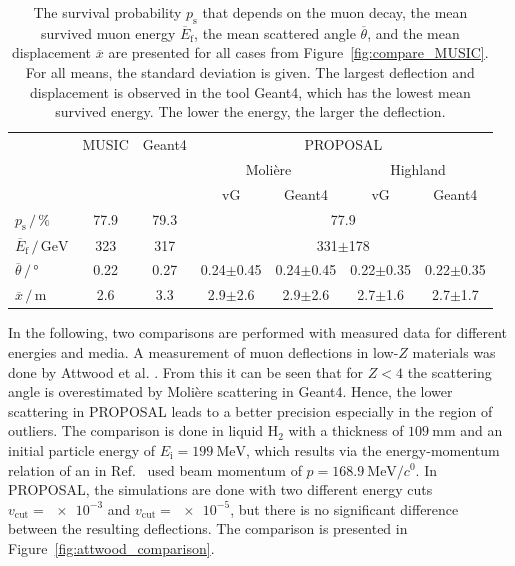 \begin{table}
    \small
    \centering
    \caption{The survival probability $p_{\text{s}}$ that depends on the muon decay, the mean survived muon 
    energy $\overline{E}_{\text{f}}$, the mean scattered angle $\overline{\theta}$,
    and the mean displacement $\overline{x}$ are presented for all cases from 
    Figure~\ref{fig:compare_MUSIC}. For all means, the standard deviation is given.
    The largest deflection and displacement is observed in the tool Geant4, which has the lowest mean survived energy. The lower the energy, the larger the deflection.}
    \begin{tabular}{l|cc|cccc}
        \toprule
        & MUSIC & Geant4 & \multicolumn{4}{c}{PROPOSAL} \\
        &  & & \multicolumn{2}{c}{Molière} & \multicolumn{2}{c}{Highland} \\
        &  &  & vG & Geant4 & vG & Geant4 \\
        \midrule
        $p_{\text{s}}\,/\,\si{\percent}$ & 77.9 & 79.3 &  \multicolumn{4}{c}{77.9}\\
        $\overline{E}_{\text{f}}\,/\,\si{\giga\electronvolt}$ & 323 & 317 & \multicolumn{4}{c}{331$\pm$178} \\
        $\overline{\theta}\,/\,\si{\degree}$ & 0.22 & 0.27 & 0.24$\pm$0.45 & 0.24$\pm$0.45 & 0.22$\pm$0.35 & 0.22$\pm$0.35   \\
        $\overline{x}\,/\,\si{\meter}$ & 2.6 & 3.3 & 2.9$\pm$2.6 & 2.9$\pm$2.6 & 2.7$\pm$1.6 & 2.7$\pm$1.7  \\
     \bottomrule
    \end{tabular}
    \label{tab:compare_MUSIC}
\end{table}

In the following, two comparisons are performed with measured data for 
different energies and media.
A measurement of muon deflections in low-$Z$ materials was done by Attwood et al. \cite{attwood_2006}. 
From this it can be seen that for $Z < 4$ the scattering angle is overestimated 
by Molière scattering in Geant4. Hence, the lower scattering in PROPOSAL leads 
to a better precision especially in the region of outliers. The comparison is 
done in liquid $\text{H}_2$ with a thickness of $\SI{109}{\milli\meter}$ and an 
initial particle energy of $E_{\mathrm{i}} = \SI{199}{\mega\electronvolt}$, which 
results via the energy-momentum relation of an in Ref.~\cite{attwood_2006} used beam momentum 
of $p = \SI[per-mode=symbol]{168.9}{\mega\electronvolt\per\clight}$. 
In PROPOSAL, the simulations are done with two different energy cuts $v_{\mathrm{cut}} = \num{e-3}$ and $v_{\mathrm{cut}} = \num{e-5}$, 
but there is no significant difference between the resulting deflections.
The comparison is presented in Figure~\ref{fig:attwood_comparison}.

